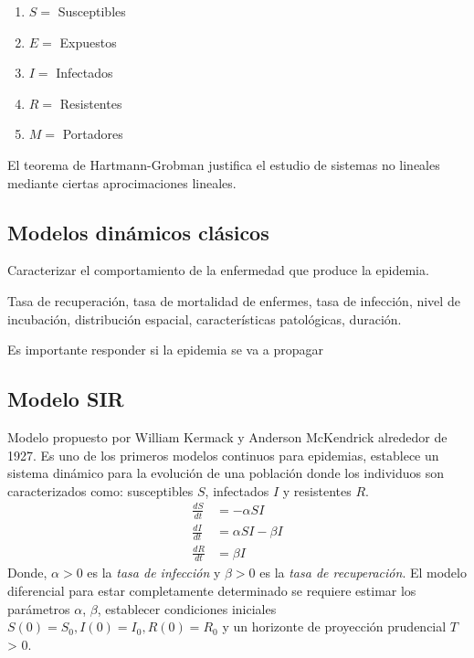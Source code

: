 \documentclass[a4paper, 10pt, twoside]{article}
\begin{document}
\begin{enumerate}
	\item $S=$ Susceptibles
	\item $E=$ Expuestos
	\item $I=$ Infectados
	\item $R=$ Resistentes
	\item $M=$ Portadores
\end{enumerate}

El teorema de Hartmann-Grobman justifica el estudio de sistemas no lineales mediante ciertas 
aprocimaciones lineales.

\subsection{Modelos dinámicos clásicos}
Caracterizar el comportamiento de la enfermedad que produce la epidemia. 

Tasa de recuperación, tasa de mortalidad de enfermes, tasa de infección, nivel de incubación, 
distribución espacial, características patológicas, duración.

Es importante responder si la epidemia se va a propagar

\subsection{Modelo SIR}
Modelo propuesto por William Kermack y Anderson McKendrick alrededor de 1927. Es uno de los primeros
modelos continuos para epidemias, establece un sistema dinámico para la evolución de una población 
donde los individuos son caracterizados como: susceptibles $S$, infectados $I$ y resistentes $R$.
\begin{align}
\frac{dS}{dt} & = -\alpha S I \nonumber \\
\frac{dI}{dt} & = \alpha S I - \beta I \\
\frac{dR}{dt} & = \beta I \nonumber
\end{align}
Donde, $\alpha > 0$ es la \emph{tasa de infección} y $\beta > 0$ es la \emph{tasa de recuperación}.
\newline
El modelo diferencial para estar completamente determinado se requiere estimar los parámetros 
$\alpha$, $\beta$, establecer condiciones iniciales $S(0) = S_0, I(0) = I_0, R(0) = R_0$ y 
un horizonte de proyección prudencial $T$ > 0.
\end{document}
